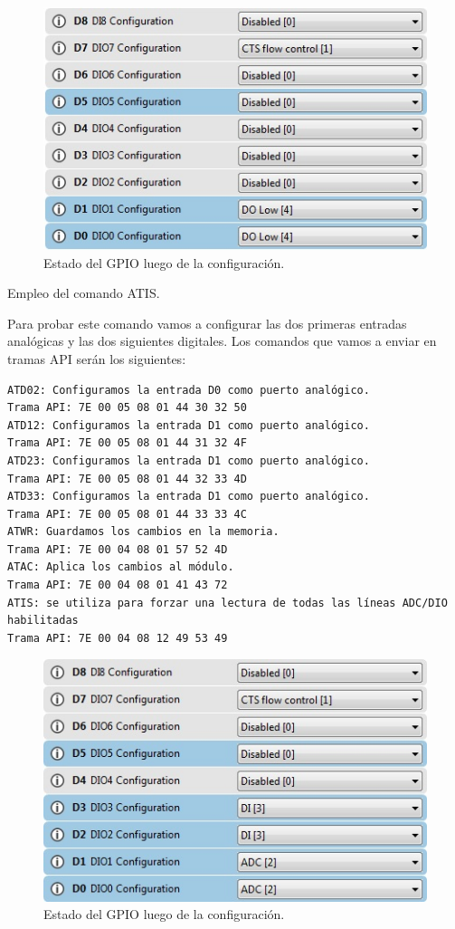 \documentclass[11pt,oneside,spanish,a4paper]{article}
\begin{document}
\begin{figure}[h]
	\centering
	\includegraphics[width=.6\textwidth]{img/IMAGEN21.jpg}
	\caption{Estado del GPIO luego de la configuración.}
\end{figure}
Empleo del comando ATIS.

Para probar este comando vamos a configurar las dos primeras entradas analógicas y las dos siguientes digitales.
Los comandos que vamos a enviar en tramas API serán los siguientes:
\begin{lstlisting}[emph={ATD02: ,Trama API:,ATD12:,ATD23:,ATD33:,ATWR:,ATAC:,ATIS:}, emphstyle={\color{green}}, label=code:apiEjempl-id]
ATD02: Configuramos la entrada D0 como puerto analógico.
Trama API: 7E 00 05 08 01 44 30 32 50
ATD12: Configuramos la entrada D1 como puerto analógico.
Trama API: 7E 00 05 08 01 44 31 32 4F
ATD23: Configuramos la entrada D1 como puerto analógico.
Trama API: 7E 00 05 08 01 44 32 33 4D
ATD33: Configuramos la entrada D1 como puerto analógico.
Trama API: 7E 00 05 08 01 44 33 33 4C
ATWR: Guardamos los cambios en la memoria.
Trama API: 7E 00 04 08 01 57 52 4D
ATAC: Aplica los cambios al módulo.
Trama API: 7E 00 04 08 01 41 43 72
ATIS: se utiliza para forzar una lectura de todas las líneas ADC/DIO habilitadas
Trama API: 7E 00 04 08 12 49 53 49
\end{lstlisting} 
\begin{figure}[h]
	\centering
	\includegraphics[width=.6\textwidth]{img/IMAGEN22.jpg}
	\caption{Estado del GPIO luego de la configuración.}
\end{figure}
\end{document}
